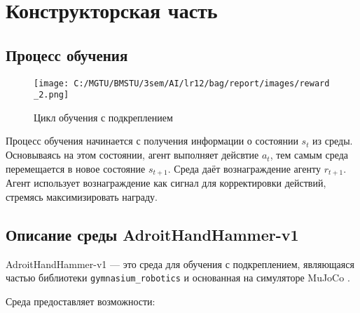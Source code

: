 \chapter{Конструкторская часть}

\section{Процесс обучения}

\begin{figure}[H]
    \centering
    \texttt{[image: C:/MGTU/BMSTU/3sem/AI/lr12/bag/report/images/reward\\\_2.png]}
    \caption{Цикл обучения с подкреплением}
\end{figure}
Процесс обучения начинается с получения информации о состоянии $s_t$ из среды. 
Основываясь на этом состоянии, агент выполняет дейсвтие $a_t$, тем самым среда перемещается в новое состояние $s_{t+1}$.
Среда даёт вознаграждение агенту $r_{t+1}$. Агент использует вознаграждение как сигнал для корректировки действий,
стремясь максимизировать награду.

\section{Описание среды AdroitHandHammer-v1}
AdroitHandHammer-v1 — это среда для обучения с подкреплением, являющаяся частью библиотеки \texttt{gymnasium\_robotics} и основанная на симуляторе MuJoCo \cite{lib:gymnasium_robotics}.

Среда предоставляет возможности:

